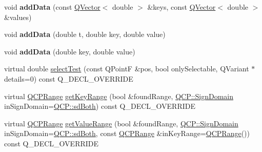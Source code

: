 \begin{DoxyCompactItemize}
\item 
void {\bfseries add\+Data} (const \hyperlink{class_q_vector}{Q\+Vector}$<$ double $>$ \&keys, const \hyperlink{class_q_vector}{Q\+Vector}$<$ double $>$ \&values)\hypertarget{class_q_c_p_curve_a6424fa06da1786648c83ad13a0d0aa14}{}\label{class_q_c_p_curve_a6424fa06da1786648c83ad13a0d0aa14}

\item 
void {\bfseries add\+Data} (double t, double key, double value)\hypertarget{class_q_c_p_curve_a13398b236f6926014e404eeb5b9f415c}{}\label{class_q_c_p_curve_a13398b236f6926014e404eeb5b9f415c}

\item 
void {\bfseries add\+Data} (double key, double value)\hypertarget{class_q_c_p_curve_ada4762e793cd5707b33f35b8a4b0f8fb}{}\label{class_q_c_p_curve_ada4762e793cd5707b33f35b8a4b0f8fb}

\item 
virtual double \hyperlink{class_q_c_p_curve_a0b3f4916f33b692508a6a1292b46880e}{select\+Test} (const Q\+PointF \&pos, bool only\+Selectable, Q\+Variant $\ast$details=0) const Q\+\_\+\+D\+E\+C\+L\+\_\+\+O\+V\+E\+R\+R\+I\+DE
\item 
virtual \hyperlink{class_q_c_p_range}{Q\+C\+P\+Range} \hyperlink{class_q_c_p_curve_a83e4b33a6f949211b0191168f8448d0b}{get\+Key\+Range} (bool \&found\+Range, \hyperlink{namespace_q_c_p_afd50e7cf431af385614987d8553ff8a9}{Q\+C\+P\+::\+Sign\+Domain} in\+Sign\+Domain=\hyperlink{namespace_q_c_p_afd50e7cf431af385614987d8553ff8a9a3dee7e9cd2fedce9253b83e172626a6c}{Q\+C\+P\+::sd\+Both}) const Q\+\_\+\+D\+E\+C\+L\+\_\+\+O\+V\+E\+R\+R\+I\+DE
\item 
virtual \hyperlink{class_q_c_p_range}{Q\+C\+P\+Range} \hyperlink{class_q_c_p_curve_a29417ac0f00534d89041153950d1b05b}{get\+Value\+Range} (bool \&found\+Range, \hyperlink{namespace_q_c_p_afd50e7cf431af385614987d8553ff8a9}{Q\+C\+P\+::\+Sign\+Domain} in\+Sign\+Domain=\hyperlink{namespace_q_c_p_afd50e7cf431af385614987d8553ff8a9a3dee7e9cd2fedce9253b83e172626a6c}{Q\+C\+P\+::sd\+Both}, const \hyperlink{class_q_c_p_range}{Q\+C\+P\+Range} \&in\+Key\+Range=\hyperlink{class_q_c_p_range}{Q\+C\+P\+Range}()) const Q\+\_\+\+D\+E\+C\+L\+\_\+\+O\+V\+E\+R\+R\+I\+DE
\end{DoxyCompactItemize}
